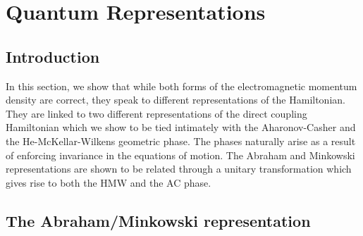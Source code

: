 \chapter{Quantum Representations}



\section{Introduction}
\label{sec:intro}

In this section, we show that while both forms of the electromagnetic momentum density are correct, they speak to different representations of the Hamiltonian. They are linked to two different representations of the direct coupling Hamiltonian which we show to be tied intimately with the Aharonov-Casher and the He-McKellar-Wilkens geometric phase.  The phases naturally arise as a result of enforcing invariance in the equations of motion.
The Abraham and Minkowski representations are shown to be related through a unitary transformation which gives rise to both the HMW and the AC phase. 

\section{The Abraham/Minkowski representation}
\label{sec:DC}

